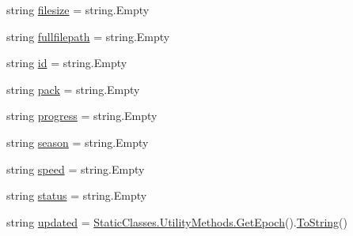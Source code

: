 \begin{DoxyCompactItemize}
\item 
string \mbox{\hyperlink{class_little_weeb_library_1_1_models_1_1_json_download_info_afd063798a57238b7cfd014f60efdfff4}{filesize}} = string.\+Empty
\item 
string \mbox{\hyperlink{class_little_weeb_library_1_1_models_1_1_json_download_info_a67b4d374c16d8ed97f39438c10196861}{fullfilepath}} = string.\+Empty
\item 
string \mbox{\hyperlink{class_little_weeb_library_1_1_models_1_1_json_download_info_ae74efeee78e915f2fff1eb34bfd125f5}{id}} = string.\+Empty
\item 
string \mbox{\hyperlink{class_little_weeb_library_1_1_models_1_1_json_download_info_a22ff0d4dde2f90e7ee5048a9cf01393f}{pack}} = string.\+Empty
\item 
string \mbox{\hyperlink{class_little_weeb_library_1_1_models_1_1_json_download_info_a7ddc5b0dc7e617ed2cf665c2e5e5345a}{progress}} = string.\+Empty
\item 
string \mbox{\hyperlink{class_little_weeb_library_1_1_models_1_1_json_download_info_a1a534e3df34b7537f0a00a0ace920ee8}{season}} = string.\+Empty
\item 
string \mbox{\hyperlink{class_little_weeb_library_1_1_models_1_1_json_download_info_a1d05f9a1872baac04d0561b5d0b34cf1}{speed}} = string.\+Empty
\item 
string \mbox{\hyperlink{class_little_weeb_library_1_1_models_1_1_json_download_info_ad948c6047f25fbd7f34cfdd53541ce5c}{status}} = string.\+Empty
\item 
string \mbox{\hyperlink{class_little_weeb_library_1_1_models_1_1_json_download_info_ae45b3e3afeb93f4cb92dc5bda3bd9535}{updated}} = \mbox{\hyperlink{class_little_weeb_library_1_1_static_classes_1_1_utility_methods_a12336d9e64983ddabaad8950486fafb2}{Static\+Classes.\+Utility\+Methods.\+Get\+Epoch}}().\mbox{\hyperlink{class_little_weeb_library_1_1_models_1_1_json_download_info_af36cbb3251b0efcd80a45f1fef89f5c9}{To\+String}}()
\end{DoxyCompactItemize}


